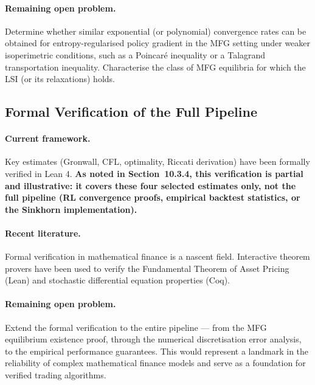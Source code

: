 \paragraph{Remaining open problem.} Determine whether similar exponential (or
polynomial) convergence rates can be obtained for entropy-regularised policy
gradient in the MFG setting under weaker isoperimetric conditions, such as a
Poincar\'e inequality or a Talagrand transportation inequality. Characterise the
class of MFG equilibria for which the LSI (or its relaxations) holds.

\subsection{Formal Verification of the Full Pipeline}

\paragraph{Current framework.} Key estimates (Gronwall, CFL, optimality, Riccati
derivation) have been formally verified in Lean 4. \textbf{As noted in
Section~10.3.4, this verification is partial and illustrative: it covers these
four selected estimates only, not the full pipeline (RL convergence proofs,
empirical backtest statistics, or the Sinkhorn implementation).}

\paragraph{Recent literature.} Formal verification in mathematical finance is a
nascent field. Interactive theorem provers have been used to verify the
Fundamental Theorem of Asset Pricing (Lean) and stochastic differential equation
properties (Coq).

\paragraph{Remaining open problem.} Extend the formal verification to the entire
pipeline --- from the MFG equilibrium existence proof, through the numerical
discretisation error analysis, to the empirical performance guarantees. This
would represent a landmark in the reliability of complex mathematical finance
models and serve as a foundation for verified trading algorithms.

